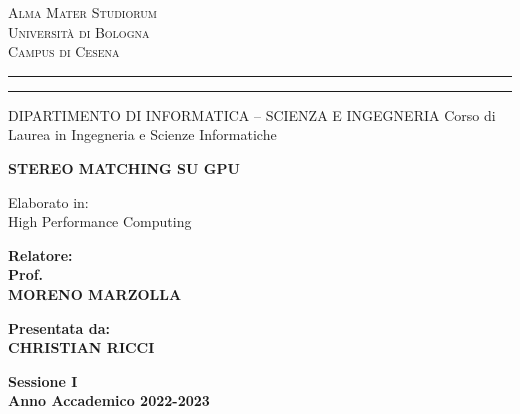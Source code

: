 \documentclass[12pt,a4paper,openright,twoside]{report}
\newcommand{\xstudent}{CHRISTIAN RICCI}
\newcommand{\xsupervisor}{MORENO MARZOLLA}
\begin{document}


\oddsidemargin=25pt

\begin{titlepage}
\begin{center}
    {\Large{\textsc{Alma Mater Studiorum}}}\\
    {\Large{\textsc{Universit\`a di Bologna}}} \\
    {\textsc{Campus di Cesena}}
    \rule[0.1cm]{14cm}{0.1mm}
    \rule[0.5cm]{14cm}{0.6mm}
    DIPARTIMENTO DI INFORMATICA – SCIENZA E INGEGNERIA
    Corso di Laurea in Ingegneria e Scienze Informatiche
\end{center}

\vspace{15mm}

\begin{center}
    {\LARGE{\bf STEREO MATCHING SU GPU}} \\
\end{center}

\vspace{15mm}

\begin{center}
     \large{ Elaborato in:\\ High Performance Computing\\}
\end{center}

\vspace{20mm}
\par
\noindent

\begin{minipage}[t]{0.47\textwidth}
    {\large{\bf Relatore:\\ Prof.\\ \xsupervisor}}
\end{minipage}
\hfill
\begin{minipage}[t]{0.47\textwidth}\raggedleft
    {\large{\bf Presentata da:\\ \xstudent}} \end{minipage}
\vspace{20mm}
\begin{center}
    \large{\bf Sessione I\\ Anno Accademico 2022-2023}
\end{center}
\end{titlepage}
\end{document}
